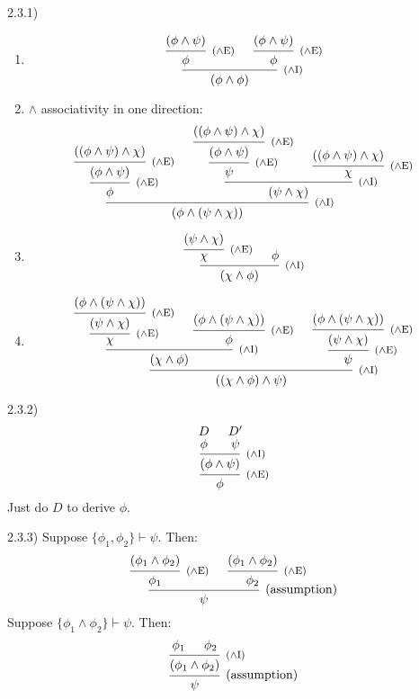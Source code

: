 \documentclass{article}
\theoremstyle{definition}
\newcommand{\ci}{\footnotesize (\(\wedge\)I)}
\newcommand{\ce}{\footnotesize (\(\wedge\)E)}
\begin{document}
2.3.1)
\begin{enumerate}
  \item
  \[
    \begin{prooftree}
      \hypo{(\phi\land\psi)}
      \infer1[\ce]{\phi}
      \hypo{(\phi\land\psi)}
      \infer1[\ce]{\phi}
      \infer2[\ci]{(\phi\land\phi)}
    \end{prooftree}
  \]

  \item \(\land\) associativity in one direction:
  \[
    \begin{prooftree}
      \hypo{((\phi\land\psi)\land\chi)}
      \infer1[\ce]{(\phi\land\psi)}
      \infer1[\ce]{\phi}
      \hypo{((\phi\land\psi)\land\chi)}
      \infer1[\ce]{(\phi\land\psi)}
      \infer1[\ce]{\psi}
      \hypo{((\phi\land\psi)\land\chi)}
      \infer1[\ce]{\chi}
      \infer2[\ci]{(\psi\land\chi)}
      \infer2[\ci]{(\phi\land(\psi\land\chi))}
    \end{prooftree}
  \]
  \item
  \[
    \begin{prooftree}
      \hypo{(\psi\land\chi)}
      \infer1[\ce]{\chi}
      \hypo{\phi}
      \infer2[\ci]{(\chi\land\phi)}
    \end{prooftree}
  \]
  \item
  \[
    \begin{prooftree}
      \hypo{(\phi\land(\psi\land\chi))}
      \infer1[\ce]{(\psi\land\chi)}
      \infer1[\ce]{\chi}
      \hypo{(\phi\land(\psi\land\chi))}
      \infer1[\ce]{\phi}
      \infer2[\ci]{(\chi\land\phi)}
      \hypo{(\phi\land(\psi\land\chi))}
      \infer1[\ce]{(\psi\land\chi)}
      \infer1[\ce]{\psi}
      \infer2[\ci]{((\chi\land\phi)\land\psi)}
    \end{prooftree}
  \]
\end{enumerate}

2.3.2)
  \[
    \begin{prooftree}
      \hypo{D}
      \infer[rule style=no rule]1{\phi}
      \hypo{D'}
      \infer[rule style=no rule]1{\psi}
      \infer2[\ci]{(\phi\land\psi)}
      \infer1[\ce]{\phi}
    \end{prooftree}
  \]
  Just do $D$ to derive $\phi$.

2.3.3) Suppose \(\{\phi_1, \phi_2\} \vdash \psi\). Then:
  \[
    \begin{prooftree}
      \hypo{(\phi_1\land\phi_2)}
      \infer1[\ce]{\phi_1}
      \hypo{(\phi_1\land\phi_2)}
      \infer1[\ce]{\phi_2}
      \infer2[(assumption)]{\psi}
    \end{prooftree}
  \]
Suppose \(\{\phi_1\land\phi_2\} \vdash \psi\). Then:
  \[
    \begin{prooftree}
      \hypo{\phi_1}
      \hypo{\phi_2}
      \infer2[\ci]{(\phi_1\land\phi_2)}
      \infer1[(assumption)]{\psi}
    \end{prooftree}
  \]
\end{document}
